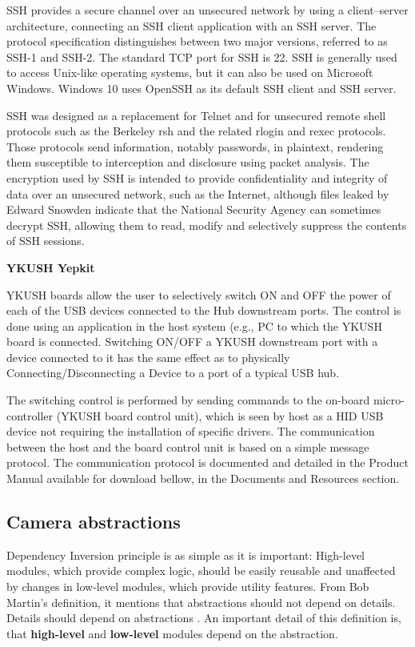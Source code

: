 SSH provides a secure channel over an unsecured network by using a client–server architecture, connecting an SSH client application with an SSH server. The protocol specification distinguishes between two major versions, referred to as SSH-1 and SSH-2. The standard TCP port for SSH is 22. SSH is generally used to access Unix-like operating systems, but it can also be used on Microsoft Windows. Windows 10 uses OpenSSH as its default SSH client and SSH server.

SSH was designed as a replacement for Telnet and for unsecured remote shell protocols such as the Berkeley rsh and the related rlogin and rexec protocols. Those protocols send information, notably passwords, in plaintext, rendering them susceptible to interception and disclosure using packet analysis. The encryption used by SSH is intended to provide confidentiality and integrity of data over an unsecured network, such as the Internet, although files leaked by Edward Snowden indicate that the National Security Agency can sometimes decrypt SSH, allowing them to read, modify and selectively suppress the contents of SSH sessions. \cite{ssh}

\vspace{0.3cm}
\textbf{YKUSH Yepkit}

YKUSH boards allow the user to selectively switch ON and OFF the power of each of the USB devices connected to the Hub downstream ports. The control is done using an application in the host system (e.g., PC to which the YKUSH board is connected. Switching ON/OFF a YKUSH downstream port with a device connected to it has the same effect as to physically Connecting/Disconnecting a Device to a port of a typical USB hub.

The switching control is performed by sending commands to the on-board micro-controller (YKUSH board control unit), which is seen by host as a HID USB device not requiring the installation of specific drivers. The communication between the host and the board control unit is based on a simple message protocol. The communication protocol is documented and detailed in the Product Manual available for download bellow, in the Documents and Resources section. \cite{yepkit}

\vspace{0.3cm}
\subsection{Camera abstractions}

Dependency Inversion principle is as simple as it is important: High-level modules, which provide complex logic, should be easily reusable and unaffected by changes in low-level modules, which provide utility features. From Bob Martin's definition, it mentions that abstractions should not depend on details. Details should depend on abstractions \cite{solid-d} \cite{uncle-bob-book}. An important detail of this definition is, that \textbf{high-level} and \textbf{low-level} modules depend on the abstraction.

